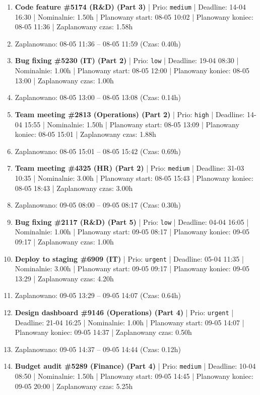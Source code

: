 {\begin{enumerate}
  \item [\textbf{14646}] \textbf{Code feature \#5174 (R\&D) (Part 3)} | Prio: \texttt{medium} | Deadline: 14-04 16:30 | Nominalnie: 1.50h | Planowany start: 08-05 10:02 | Planowany koniec: 08-05 11:36 | Zaplanowany czas: 1.58h
  \item [\textbf{PRZERWA}] Zaplanowano: 08-05 11:36 -- 08-05 11:59 (Czas: 0.40h)
  \item [\textbf{14680}] \textbf{Bug fixing \#5230 (IT) (Part 2)} | Prio: \texttt{low} | Deadline: 19-04 08:30 | Nominalnie: 1.00h | Planowany start: 08-05 12:00 | Planowany koniec: 08-05 13:00 | Zaplanowany czas: 1.00h
  \item [\textbf{PRZERWA}] Zaplanowano: 08-05 13:00 -- 08-05 13:08 (Czas: 0.14h)
  \item [\textbf{14617}] \textbf{Team meeting \#2813 (Operations) (Part 2)} | Prio: \texttt{high} | Deadline: 14-04 15:55 | Nominalnie: 1.50h | Planowany start: 08-05 13:09 | Planowany koniec: 08-05 15:01 | Zaplanowany czas: 1.88h
  \item [\textbf{PRZERWA}] Zaplanowano: 08-05 15:01 -- 08-05 15:42 (Czas: 0.69h)
  \item [\textbf{14641}] \textbf{Team meeting \#4325 (HR) (Part 2)} | Prio: \texttt{medium} | Deadline: 31-03 10:35 | Nominalnie: 3.00h | Planowany start: 08-05 15:43 | Planowany koniec: 08-05 18:43 | Zaplanowany czas: 3.00h
  \item [\textbf{PRZERWA}] Zaplanowano: 09-05 08:00 -- 09-05 08:17 (Czas: 0.30h)
  \item [\textbf{14689}] \textbf{Bug fixing \#2117 (R\&D) (Part 5)} | Prio: \texttt{low} | Deadline: 04-04 16:05 | Nominalnie: 1.00h | Planowany start: 09-05 08:17 | Planowany koniec: 09-05 09:17 | Zaplanowany czas: 1.00h
  \item [\textbf{14597}] \textbf{Deploy to staging \#6909 (IT)} | Prio: \texttt{urgent} | Deadline: 05-04 11:35 | Nominalnie: 3.00h | Planowany start: 09-05 09:17 | Planowany koniec: 09-05 13:29 | Zaplanowany czas: 4.20h
  \item [\textbf{PRZERWA}] Zaplanowano: 09-05 13:29 -- 09-05 14:07 (Czas: 0.64h)
  \item [\textbf{14606}] \textbf{Design dashboard \#9146 (Operations) (Part 4)} | Prio: \texttt{urgent} | Deadline: 21-04 16:25 | Nominalnie: 1.00h | Planowany start: 09-05 14:07 | Planowany koniec: 09-05 14:37 | Zaplanowany czas: 0.50h
  \item [\textbf{PRZERWA}] Zaplanowano: 09-05 14:37 -- 09-05 14:44 (Czas: 0.12h)
  \item [\textbf{14630}] \textbf{Budget audit \#5289 (Finance) (Part 4)} | Prio: \texttt{medium} | Deadline: 10-04 08:50 | Nominalnie: 1.50h | Planowany start: 09-05 14:45 | Planowany koniec: 09-05 20:00 | Zaplanowany czas: 5.25h
\end{enumerate}
}

